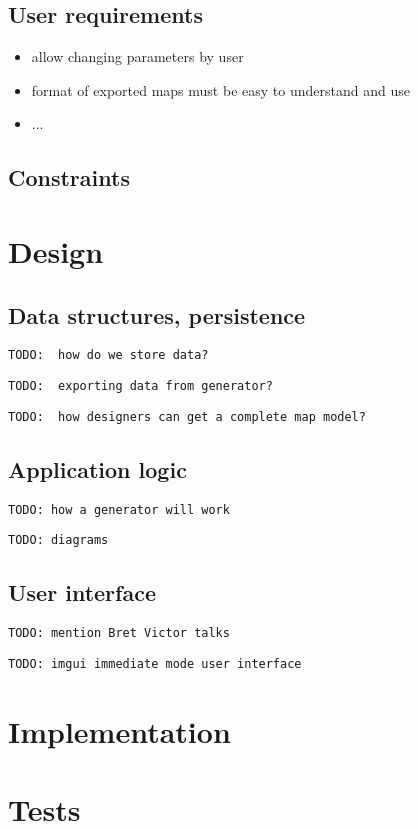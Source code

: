 \documentclass[12pt]{report}
\newcommand{\todo}[1]{}
\renewcommand{\todo}[1]{{\color{red} \par \noindent \footnotesize \texttt{TODO: {#1} }}}
\begin{document}
\subsection{User requirements}

\begin{itemize}
	\item allow changing parameters by user
	\item format of exported maps must be easy to understand and use
	\item ...
\end{itemize}

\subsection{Constraints}


\section{Design}
\subsection{Data structures, persistence}
 
\todo{ how do we store data?}
\todo{ exporting data from generator? }
\todo{ how designers can get a complete map model? } 
 
\subsection{Application logic} 

\todo{how a generator will work}
\todo{diagrams}

\subsection{User interface}

\todo{mention Bret Victor talks}
\todo{imgui immediate mode user interface}

\section{Implementation}



\section{Tests} 
\end{document}
